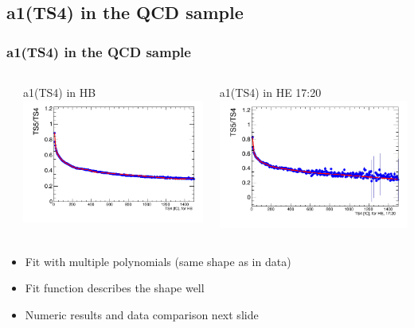 \documentclass[bigger]{beamer}
\begin{document}
\subsection{a1(TS4) in the QCD sample}
\label{sec-3-5}
\begin{frame}
\frametitle{a1(TS4) in the QCD sample}
\label{sec-3-5-1}
\begin{columns} %
\label{sec-3-5-1-1}
\begin{column}{0.5\textwidth}
\label{sec-3-5-1-1-1}

\centering
a1(TS4) in HB
\includegraphics[width=\textwidth]{fig/a1_ring0.png}
\end{column}
\begin{column}{0.5\textwidth}
\label{sec-3-5-1-1-2}

\centering
a1(TS4) in HE 17:20
\includegraphics[width=\textwidth]{fig/a1_ring1.png}
\end{column}
\end{columns}
\label{sec-3-5-1-2}
\begin{itemize}

\item Fit with multiple polynomials (same shape as in data)
\label{sec-3-5-1-2-1}%

\item Fit function describes the shape well
\label{sec-3-5-1-2-2}%

\item Numeric results and data comparison next slide
\label{sec-3-5-1-2-3}%
\end{itemize} %
\end{frame}
\end{document}
